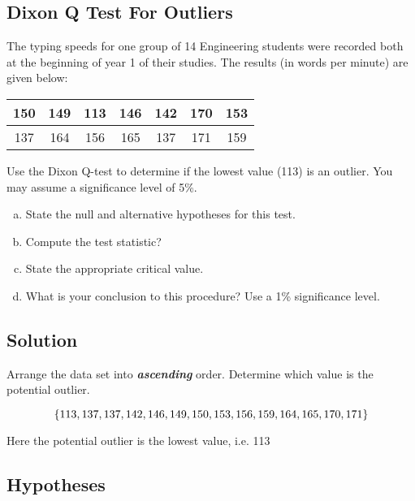 \documentclass[a4paper,12pt]{article}
\begin{document}
\large 
\subsection*{Dixon Q Test For Outliers}

The typing speeds for one group of 14 Engineering students were recorded both at the beginning of year 1 of their studies. The results (in words per minute) are given below:

\begin{center}
	\begin{tabular}{|c|c|c|c|c|c|c|}
		\hline
		150 &149 & 113 & 146 & 142 &170& 153\\ \hline
		137 & 164 & 156& 165& 137& 171& 159
		\\ \hline
	\end{tabular}
\end{center}
Use the Dixon Q-test to determine if the lowest value (113) is an outlier. You may assume a significance level of 5\%.

\begin{enumerate}[(a)]
\item  State the null and alternative hypotheses for this test.
\item  Compute the test statistic?
\item  State the appropriate critical value.
\item  What is your conclusion to this procedure? Use a 1\% significance level.
\end{enumerate}



\subsection*{Solution}
Arrange the data set into \textbf{\textit{ascending}} order. Determine which value is the potential outlier.

\[\LARGE \{ 113, 137, 137, 142, 146, 149, 150, 153, 156, 159, 164, 165, 
170, 171\} \]

\noindent Here the potential outlier is the lowest value, i.e. 113

\subsection*{Hypotheses}
\end{document}
